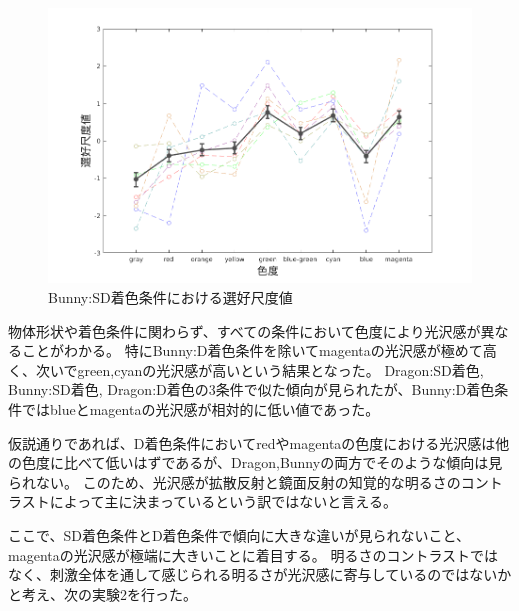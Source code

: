         \begin{figure}
            \centering
            \includegraphics[width=14.0cm]{./img/ex1_res_BD.png}
            \caption{Bunny:SD着色条件における選好尺度値}
            \label{ex1_BD}
        \end{figure}

        物体形状や着色条件に関わらず、すべての条件において色度により光沢感が異なることがわかる。
        特にBunny:D着色条件を除いてmagentaの光沢感が極めて高く、次いでgreen,cyanの光沢感が高いという結果となった。
        Dragon:SD着色, Bunny:SD着色, Dragon:D着色の3条件で似た傾向が見られたが、Bunny:D着色条件ではblueとmagentaの光沢感が相対的に低い値であった。

        仮説通りであれば、D着色条件においてredやmagentaの色度における光沢感は他の色度に比べて低いはずであるが、Dragon,Bunnyの両方でそのような傾向は見られない。
        このため、光沢感が拡散反射と鏡面反射の知覚的な明るさのコントラストによって主に決まっているという訳ではないと言える。

        ここで、SD着色条件とD着色条件で傾向に大きな違いが見られないこと、magentaの光沢感が極端に大きいことに着目する。
        明るさのコントラストではなく、刺激全体を通して感じられる明るさが光沢感に寄与しているのではないかと考え、次の実験2を行った。
